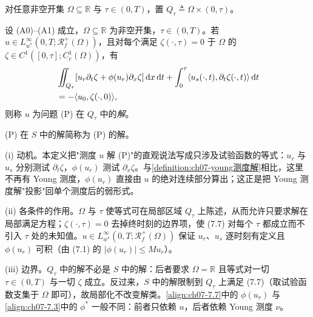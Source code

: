 ﻿\documentclass[../../main.tex]{subfiles}%
\begin{document}
对任意非空开集 $\Omega\subseteq\mathbb{R}$ 与 $\tau\in(0,T)$，置 $Q_\tau\triangleq\Omega\times(0,\tau)$。

\begin{definition}\label{definition:ch07-熵解}
设 (A0)--(A1) 成立，$\Omega\subseteq\mathbb{R}$ 为非空开集，$\tau\in(0,T)$。若 $u\in L^\infty_{w^*}(0,T;\mathscr{R}_f^+(\Omega))$，且对每个满足 $\zeta(\cdot,\tau)=0$ 于 $\Omega$ 的 $\zeta\in C^1([0,\tau];C_c^1(\Omega))$，有
\begin{align}
&\iint_{Q_\tau}[u_r\partial_t\zeta+\phi(u_r)\partial_x\zeta]\,\mathrm{d}x\,\mathrm{d}t
+\int_0^\tau\langle u_s(\cdot,t),\partial_t\zeta(\cdot,t)\rangle\,\mathrm{d}t\notag\\
&=-\langle u_0,\zeta(\cdot,0)\rangle, \label{align:ch07-7.7}
\end{align}
则称 $u$ 为问题 (P) 在 $Q_\tau$ 中的\emph{解}。
\end{definition}

(P) 在 $S$ 中的解简称为 (P) 的解。

\begin{remark}\label{remark:ch07-熵解动机}
(i) 动机。本定义把"测度 $u$ 解 (P)"的直观说法写成只涉及试验函数的等式：$u_r$ 与 $u_s$ 分别测试 $\partial_t\zeta$，$\phi(u_r)$ 测试 $\partial_x\zeta$。与\cref{definition:ch07-young测度解}相比，这里不再有 Young 测度，$\phi(u_r)$ 直接由 $u$ 的绝对连续部分算出；这正是把 Young 测度解"投影"回单个测度后的弱形式。

(ii) 各条件的作用。$\Omega$ 与 $\tau$ 使等式可在局部区域 $Q_\tau$ 上陈述，从而允许只要求解在局部满足方程；$\zeta(\cdot,\tau)=0$ 去掉终时刻的边界项，使 (7.7) 对每个 $\tau$ 都成立而不引入 $\tau$ 处的未知值。$u\in L^\infty_{w^*}(0,T;\mathscr{R}_f^+(\Omega))$ 保证 $u_r$、$u_s$ 逐时刻有定义且 $\phi(u_r)$ 可积（由 (7.1) 的 $|\phi(u_r)|\leqslant Mu_r$）。

(iii) 边界。$Q_\tau$ 中的解不必是 $S$ 中的解：后者要求 $\Omega=\mathbb{R}$ 且等式对一切 $\tau\in(0,T)$ 与一切 $\zeta$ 成立。反过来，$S$ 中的解限制到 $Q_\tau$ 上满足 (7.7)（取试验函数支集于 $\Omega$ 即可），故局部化不改变解类。\eqref{align:ch07-7.7}中的 $\phi(u_r)$ 与\eqref{align:ch07-7.3}中的 $\phi^*$ 一般不同：前者只依赖 $u$，后者依赖 Young 测度 $\nu$。
\end{remark}
\end{document}
